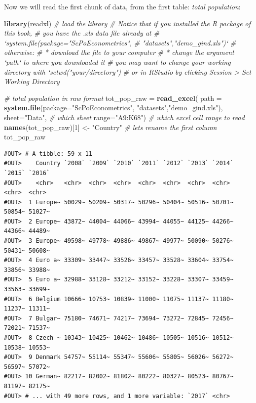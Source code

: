 \documentclass[]{book}
\newenvironment{Shaded}{\begin{snugshade}}{\end{snugshade}}
\newcommand{\KeywordTok}[1]{\textcolor[rgb]{0.13,0.29,0.53}{\textbf{#1}}}
\newcommand{\DataTypeTok}[1]{\textcolor[rgb]{0.13,0.29,0.53}{#1}}
\newcommand{\DecValTok}[1]{\textcolor[rgb]{0.00,0.00,0.81}{#1}}
\newcommand{\StringTok}[1]{\textcolor[rgb]{0.31,0.60,0.02}{#1}}
\newcommand{\CommentTok}[1]{\textcolor[rgb]{0.56,0.35,0.01}{\textit{#1}}}
\newcommand{\NormalTok}[1]{#1}
\theoremstyle{definition}
\theoremstyle{definition}
\theoremstyle{definition}
\theoremstyle{remark}
\begin{document}
Now we will read the first chunk of data, from the first table:
\emph{total population}:

\begin{Shaded}
\begin{Highlighting}[]
\KeywordTok{library}\NormalTok{(readxl)  }\CommentTok{# load the library}
\CommentTok{# Notice that if you installed the R package of this book,}
\CommentTok{# you have the .xls data file already at }
\CommentTok{# `system.file(package="ScPoEconometrics",}
\CommentTok{#                        "datasets","demo_gind.xls")`}
\CommentTok{# otherwise:}
\CommentTok{# * download the file to your computer}
\CommentTok{# * change the argument `path` to where you downloaded it}
\CommentTok{# you may want to change your working directory with `setwd("your/directory")}
\CommentTok{# or in RStudio by clicking Session > Set Working Directory}

\CommentTok{# total population in raw format}
\NormalTok{tot_pop_raw =}\StringTok{ }\KeywordTok{read_excel}\NormalTok{(}
                \DataTypeTok{path =} \KeywordTok{system.file}\NormalTok{(}\DataTypeTok{package=}\StringTok{"ScPoEconometrics"}\NormalTok{,}
                                    \StringTok{"datasets"}\NormalTok{,}\StringTok{"demo_gind.xls"}\NormalTok{), }
                \DataTypeTok{sheet=}\StringTok{"Data"}\NormalTok{, }\CommentTok{# which sheet}
                \DataTypeTok{range=}\StringTok{"A9:K68"}\NormalTok{)  }\CommentTok{# which excel cell range to read}
\KeywordTok{names}\NormalTok{(tot_pop_raw)[}\DecValTok{1}\NormalTok{] <-}\StringTok{ "Country"}   \CommentTok{# lets rename the first column}
\NormalTok{tot_pop_raw}
\end{Highlighting}
\end{Shaded}

\begin{verbatim}
#OUT> # A tibble: 59 x 11
#OUT>    Country `2008` `2009` `2010` `2011` `2012` `2013` `2014` `2015` `2016`
#OUT>    <chr>   <chr>  <chr>  <chr>  <chr>  <chr>  <chr>  <chr>  <chr>  <chr> 
#OUT>  1 Europe~ 50029~ 50209~ 50317~ 50296~ 50404~ 50516~ 50701~ 50854~ 51027~
#OUT>  2 Europe~ 43872~ 44004~ 44066~ 43994~ 44055~ 44125~ 44266~ 44366~ 44489~
#OUT>  3 Europe~ 49598~ 49778~ 49886~ 49867~ 49977~ 50090~ 50276~ 50431~ 50608~
#OUT>  4 Euro a~ 33309~ 33447~ 33526~ 33457~ 33528~ 33604~ 33754~ 33856~ 33988~
#OUT>  5 Euro a~ 32988~ 33128~ 33212~ 33152~ 33228~ 33307~ 33459~ 33563~ 33699~
#OUT>  6 Belgium 10666~ 10753~ 10839~ 11000~ 11075~ 11137~ 11180~ 11237~ 11311~
#OUT>  7 Bulgar~ 75180~ 74671~ 74217~ 73694~ 73272~ 72845~ 72456~ 72021~ 71537~
#OUT>  8 Czech ~ 10343~ 10425~ 10462~ 10486~ 10505~ 10516~ 10512~ 10538~ 10553~
#OUT>  9 Denmark 54757~ 55114~ 55347~ 55606~ 55805~ 56026~ 56272~ 56597~ 57072~
#OUT> 10 German~ 82217~ 82002~ 81802~ 80222~ 80327~ 80523~ 80767~ 81197~ 82175~
#OUT> # ... with 49 more rows, and 1 more variable: `2017` <chr>
\end{verbatim}
\end{document}
